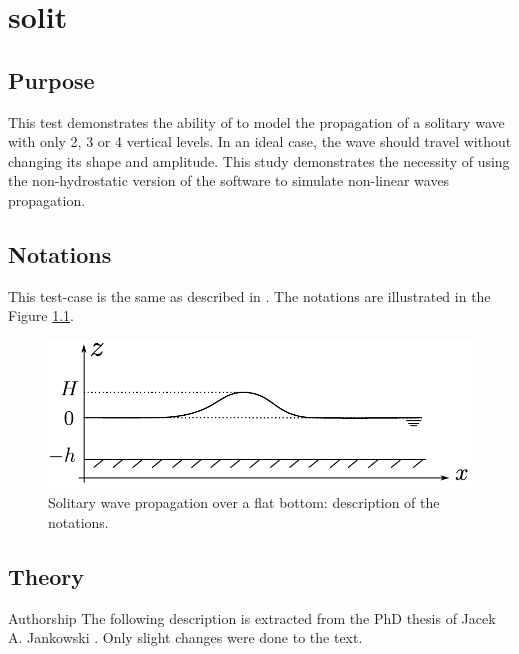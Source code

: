 \chapter{solit}
%
%

\section{Purpose}
%
This test demonstrates the ability of  to model the
propagation of a solitary wave with only 2, 3 or 4 vertical levels.
In an ideal case, the wave should travel without changing its shape and amplitude.
This study demonstrates the necessity of using the non-hydrostatic
version of the software to simulate non-linear waves propagation.
%
\section{Notations}

This test-case is the same as described in \cite{Jankowski1999}. The notations
are illustrated in the Figure \ref{fig:solit_notations}.

\begin{figure}[H]
\begin{center}
  \includegraphics[scale=0.7]{img/figure1.pdf}
\end{center}
\caption{Solitary wave propagation over a flat bottom: description of the notations.}
\label{fig:solit_notations}
\end{figure}


\section{Theory}

\begin{WarningBlock}{Authorship}
The following description is extracted from the PhD thesis of Jacek A. Jankowski \cite{Jankowski1999}.
Only slight changes were done to the text.
\end{WarningBlock}

